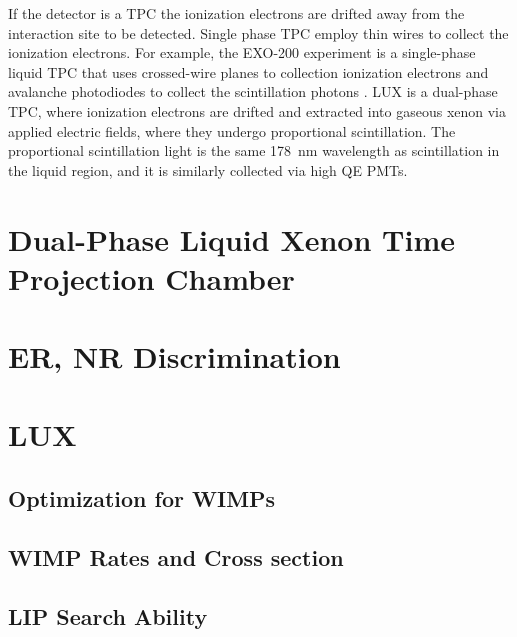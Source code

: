 If the detector is a \ac{TPC} the ionization electrons are drifted away from the interaction site to be detected. Single phase \ac{TPC} employ thin wires to collect the ionization electrons. For example, the EXO-200 experiment is a single-phase liquid \ac{TPC} that uses crossed-wire planes to collection ionization electrons and avalanche photodiodes to collect the scintillation photons \cite{Auger2012}. LUX is a dual-phase \ac{TPC}, where ionization electrons are drifted and extracted into gaseous xenon via applied electric fields, where they undergo proportional scintillation. The proportional scintillation light is the same 178~nm wavelength as scintillation in the liquid region, and it is similarly collected via high \ac{QE} \ac{PMT}s.


\section{Dual-Phase Liquid Xenon Time Projection Chamber}
\section{ER, NR Discrimination}
\label{sec:er_nr_discrimination}

\section{LUX}
\subsection{Optimization for WIMPs}
\subsection{WIMP Rates and Cross section}
\subsection{LIP Search Ability}



